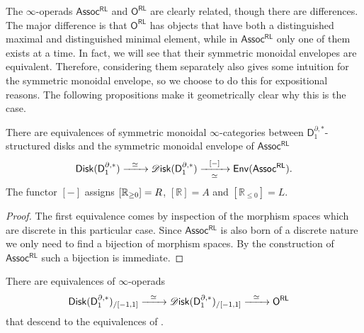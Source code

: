 \documentclass[../text]{subfiles}
\begin{document}
\begin{remark}
    The $\infty$-operads $\mathsf{Assoc^{RL}}$ and $\mathsf{O^{RL}}$ are clearly related, though there are differences. The major difference is that $\mathsf{O^{RL}}$ has objects that have both a distinguished maximal and distinguished minimal element, while in $\mathsf{Assoc^{RL}}$ only one of them exists at a time. In fact, we will see that their symmetric monoidal envelopes are equivalent. Therefore, considering them separately also gives some intuition for the symmetric monoidal envelope, so we choose to do this for expositional reasons. The following propositions make it geometrically clear why this is the case.
\end{remark}

\begin{proposition}\label{prop:disk1bor=assocRL}
    There are equivalences of symmetric monoidal $\infty$-categories between $\mathsf{D}_1^{\partial, *}$-structured disks and the symmetric monoidal envelope of $\mathsf{Assoc^{RL}}$
    \begin{equation}
        \disk[r] (\mathsf{D}_1^{\partial, *}) \xrightarrow{\ \ \simeq \ \ } \disk (\mathsf{D}_1^{\partial, *}) \xrightarrow[\simeq]{\ \ [-] \ \ } \mathsf{Env} (\mathsf{Assoc^{RL}}).
    \end{equation}
    The functor $[-]$ assigns $[\mathbb{R}_{\geq 0}] = R$, $[\mathbb{R}] = A$ and $[\mathbb{R}_{\leq 0}] = L$.
\end{proposition}

\begin{proof}
    The first equivalence comes by inspection of the morphism spaces which are discrete in this particular case. Since $\mathsf{Assoc^{RL}}$ is also born of a discrete nature we only need to find a bijection of morphism spaces. By the construction of $\mathsf{Assoc^{RL}}$ such a bijection is immediate.
\end{proof}

\begin{proposition}\label{prop:disk1bor_over_int=ORL}
    There are equivalences of $\infty$-operads
    \begin{equation}
        \disk[r] (\mathsf{D}_1^{\partial, *})_{/[-1,1]} \xrightarrow{\ \ \simeq \ \ } \disk (\mathsf{D}_1^{\partial, *})_{/[-1,1]} \xrightarrow{\ \ \simeq \ \ } \mathsf{O^{RL}} \quad
    \end{equation}
    that descend to the equivalences of .
\end{proposition}
\end{document}
